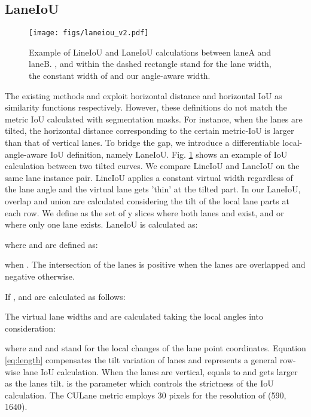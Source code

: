 \documentclass[10pt,twocolumn,letterpaper]{article}
\begin{document}
\subsection{LaneIoU}

\begin{figure}[t]
\begin{center}
    \centering
    \texttt{[image: figs/laneiou\_v2.pdf]}
\end{center}
   \caption{Example of LineIoU \cite{Zheng_2022_CVPR} and LaneIoU calculations between laneA and laneB. ,  and  within the dashed rectangle stand for the lane width, the constant width of \cite{Zheng_2022_CVPR} and our angle-aware width.}
\label{fig:laneiou}
\end{figure}

The existing methods \cite{Liu_2021_ICCV} and \cite{Zheng_2022_CVPR} exploit horizontal distance and horizontal IoU as similarity functions respectively. However, these definitions do not match the metric IoU calculated with segmentation masks. 
For instance, when the lanes are tilted, the horizontal distance corresponding to the certain metric-IoU is larger than that of vertical lanes.
To bridge the gap, we introduce a differentiable local-angle-aware IoU definition, namely LaneIoU. 
Fig. \ref{fig:laneiou} shows an example of IoU calculation between two tilted curves. We compare LineIoU \cite{Zheng_2022_CVPR} and LaneIoU on the same lane instance pair. 
LineIoU applies a constant virtual width regardless of the lane angle and the virtual lane gets 'thin' at the tilted part.
In our LaneIoU, overlap and union are calculated considering the tilt of the local lane parts at each row. We define  as the set of y slices where both lanes  and  exist, and  or  where only one lane exists. LaneIoU is calculated as:

where  and  are defined as:


when . The intersection of the lanes is positive when the lanes are overlapped and negative otherwise.

\noindent If  ,  and  are calculated as follows:


The virtual lane widths  and  are calculated taking the local angles into consideration: 

where  and  and  stand for the local changes of the lane point coordinates. Equation \ref{eq:length} compensates the tilt variation of lanes and represents a general row-wise lane IoU calculation. When  the lanes are vertical,  equals to  and gets larger as the lanes tilt. 
 is the parameter which controls the strictness of the IoU calculation.
The CULane metric employs 30 pixels for the resolution of (590, 1640).
\end{document}
